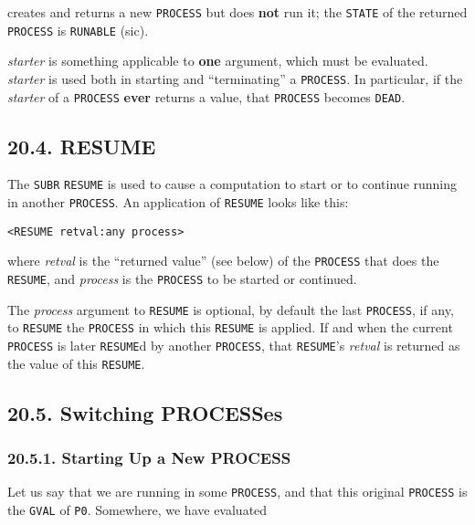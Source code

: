 \documentclass[a4paper,]{article}
\begin{document}
 creates and returns a new \texttt{PROCESS} but does \textbf{not} run it; the \texttt{STATE}
of the returned \texttt{PROCESS} is \texttt{RUNABLE} (sic).

\emph{starter} is something applicable to \textbf{one} argument, which must be evaluated. \emph{starter} is used both in
starting and ``terminating'' a \texttt{PROCESS}. In particular, if the \emph{starter} of a \texttt{PROCESS} \textbf{ever}
returns a value, that \texttt{PROCESS} becomes \texttt{DEAD}.

\subsection{20.4. RESUME}\label{resume}

 The \texttt{SUBR} \texttt{RESUME} is used to cause a computation to start or to continue
running in another \texttt{PROCESS}. An application of \texttt{RESUME} looks like this:

\begin{verbatim}
<RESUME retval:any process>
\end{verbatim}

where \emph{retval} is the ``returned value'' (see below) of the \texttt{PROCESS} that does the \texttt{RESUME}, and
\emph{process} is the \texttt{PROCESS} to be started or continued.

The \emph{process} argument to \texttt{RESUME} is optional, by default the last \texttt{PROCESS}, if any, to
\texttt{RESUME} the \texttt{PROCESS} in which this \texttt{RESUME} is applied. If and when the current \texttt{PROCESS} is
later \texttt{RESUME}d by another \texttt{PROCESS}, that \texttt{RESUME}'s \emph{retval} is returned as the value of this
\texttt{RESUME}.

\subsection{20.5. Switching PROCESSes}\label{switching-processes}

\subsubsection{20.5.1. Starting Up a New PROCESS}\label{starting-up-a-new-process}

Let us say that we are running in some \texttt{PROCESS}, and that this original \texttt{PROCESS} is the \texttt{GVAL} of
\texttt{P0}. Somewhere, we have evaluated
\end{document}
